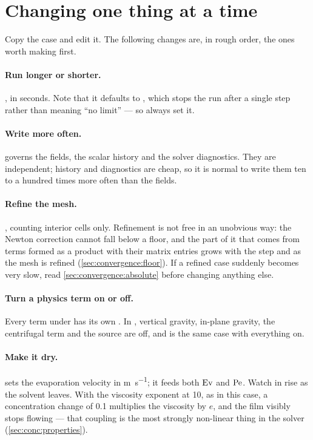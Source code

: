 \section{Changing one thing at a time}
\label{sec:firstrun:changing}

Copy the case and edit it. The following changes are, in rough order, the ones
worth making first.

\paragraph{Run longer or shorter.} , in seconds. Note
that it defaults to , which stops the run after a single step rather
than meaning ``no limit'' --- so always set it.

\paragraph{Write more often.}  governs the
fields,  the scalar history and
 the solver diagnostics. They are independent;
history and diagnostics are cheap, so it is normal to write them ten to a
hundred times more often than the fields.

\paragraph{Refine the mesh.} , counting interior cells only.
Refinement is not free in an unobvious way: the Newton correction cannot fall
below a floor, and the part of it that comes from terms formed as a product
with their matrix entries grows with the step and as the mesh is refined
(\cref{sec:convergence:floor}). If a refined case suddenly becomes very slow,
read \cref{sec:convergence:absolute} before changing anything else.

\paragraph{Turn a physics term on or off.} Every term under  has
its own . In , vertical gravity,
in-plane gravity, the centrifugal term and the source are off, and
 is the same case with everything on.

\paragraph{Make it dry.}  sets the evaporation
velocity in \si{\metre\per\second}; it feeds both $\mathrm{Ev}$ and $\mathrm{Pe}$. Watch
 in  rise as the solvent leaves. With the
viscosity exponent at 10, as in this case, a concentration change of 0.1
multiplies the viscosity by $e$, and the film visibly stops flowing --- that
coupling is the most strongly non-linear thing in the solver
(\cref{sec:conc:properties}).

